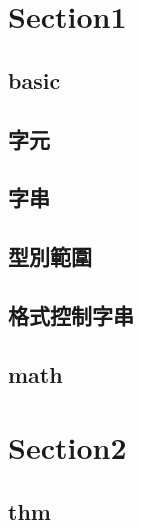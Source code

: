 \section{Section1}
    \subsection{basic}
        
    \subsection{字元}
        
    \subsection{字串}
        
    \subsection{型別範圍}
        
    \subsection{格式控制字串}
        
    \subsection{math}
        

\section{Section2}
    \subsection{thm}
        